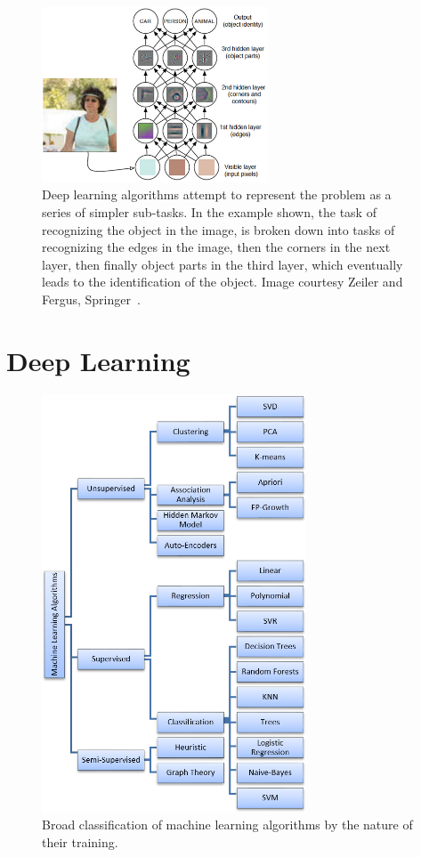 	\begin{figure}
	\centering
	\includegraphics[width=0.6\textwidth]{Figures/deeplearning2}
	\caption[Illustration of deep algorithms.]{Deep learning algorithms attempt to represent the problem as a series of simpler sub-tasks. In the example shown, the task of recognizing the object in the image, is broken down into tasks of recognizing the edges in the image, then the corners in the next layer, then finally object parts in the third layer, which eventually leads to the identification of the object.  Image courtesy Zeiler and Fergus, Springer~\cite{zeiler2014visualizing}.  }
	\label{fig:deepimg}
	\end{figure}

\section{Deep Learning}

	\begin{figure}
	\centering
	\includegraphics[width=0.7\textwidth]{Figures/MLtypes}
	\caption{Broad classification of machine learning algorithms by the nature of their training.}
	\label{fig:mltypes}
	\end{figure}

